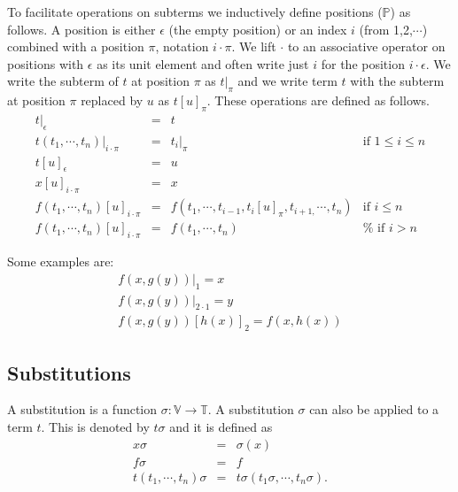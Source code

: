 \documentclass{article}
\begin{document}
To facilitate operations on subterms we inductively define positions ($%
\mathbb{P}$) as follows. A position is either $\epsilon $ (the empty
position) or an index $i$ (from 1,2,$\cdots $) combined with a position $\pi 
$, notation $i\cdot \pi $. We lift $\cdot $ to an associative operator on
positions with $\epsilon $ as its unit element and often write just $i$ for
the position $i\cdot \epsilon $. We write the subterm of $t$ at position $%
\pi $ as $t|_{\pi }$ and we write term $t$ with the subterm at position $\pi 
$ replaced by $u$ as $t[u]_{\pi }$. These operations are defined as follows.%
\begin{equation*}
\begin{array}{llll}
t|_{\epsilon } & = & t &  \\ 
t(t_{1},\cdots ,t_{n})|_{i\cdot \pi } & = & t_{i}|_{\pi } & \text{if }1\leq
i\leq n \\ 
t[u]_{\epsilon } & = & u &  \\ 
x[u]_{i\cdot \pi } & = & x &  \\ 
f(t_{1},\cdots ,t_{n})[u]_{i\cdot \pi } & = & f(t_{1},\cdots
,t_{i-1},t_{i}[u]_{\pi },t_{i+1,}\cdots ,t_{n}) & \text{if }i\leq n \\ 
f(t_{1},\cdots ,t_{n})[u]_{i\cdot \pi } & = & f(t_{1},\cdots ,t_{n}) & \text{%
if }i>n%
\end{array}%
\end{equation*}

Some examples are:%
\begin{equation*}
\begin{array}{l}
f(x,g(y))|_{1}=x \\ 
f(x,g(y))|_{2\cdot 1}=y \\ 
f(x,g(y))[h(x)]_{2}=f(x,h(x))%
\end{array}%
\end{equation*}

\subsection{Substitutions}

A substitution is a function $\sigma :\mathbb{V\rightarrow T}$. A
substitution $\sigma $ can also be applied to a term $t$. This is denoted by 
$t\sigma $ and it is defined as%
\begin{equation*}
\begin{array}{lll}
x\sigma & = & \sigma (x) \\ 
f\sigma & = & f \\ 
t(t_{1},\cdots ,t_{n})\sigma & = & t\sigma (t_{1}\sigma ,\cdots ,t_{n}\sigma
).%
\end{array}%
\end{equation*}
\end{document}
